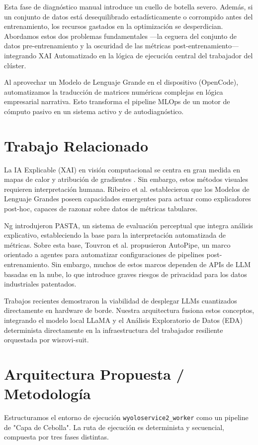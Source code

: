 \documentclass[10pt,twocolumn,letterpaper]{article}
\begin{document}
Esta fase de diagnóstico manual introduce un cuello de botella severo. Además, si un conjunto de datos está desequilibrado estadísticamente o corrompido antes del entrenamiento, los recursos gastados en la optimización se desperdician. Abordamos estos dos problemas fundamentales —la ceguera del conjunto de datos pre-entrenamiento y la oscuridad de las métricas post-entrenamiento— integrando XAI Automatizado en la lógica de ejecución central del trabajador del clúster.

Al aprovechar un Modelo de Lenguaje Grande en el dispositivo (OpenCode), automatizamos la traducción de matrices numéricas complejas en lógica empresarial narrativa. Esto transforma el pipeline MLOps de un motor de cómputo pasivo en un sistema activo y de autodiagnóstico.

\section{Trabajo Relacionado}
La IA Explicable (XAI) en visión computacional se centra en gran medida en mapas de calor y atribución de gradientes \cite{selvaraju2017grad, lundberg2017unified}. Sin embargo, estos métodos visuales requieren interpretación humana. Ribeiro et al. \cite{ribeiro2016should} establecieron que los Modelos de Lenguaje Grandes poseen capacidades emergentes para actuar como explicadores post-hoc, capaces de razonar sobre datos de métricas tabulares.

Ng \cite{ng2021data} introdujeron PASTA, un sistema de evaluación perceptual que integra análisis explicativo, estableciendo la base para la interpretación automatizada de métricas. Sobre esta base, Touvron et al. \cite{touvron2023llama} propusieron AutoPipe, un marco orientado a agentes para automatizar configuraciones de pipelines post-entrenamiento. Sin embargo, muchos de estos marcos dependen de APIs de LLM basadas en la nube, lo que introduce graves riesgos de privacidad para los datos industriales patentados.

Trabajos recientes demostraron la viabilidad de desplegar LLMs cuantizados directamente en hardware de borde. Nuestra arquitectura fusiona estos conceptos, integrando el modelo local LLaMA \cite{touvron2023llama} y el Análisis Exploratorio de Datos (EDA) determinista \cite{ng2021data} directamente en la infraestructura del trabajador resiliente orquestada por wisrovi-suit.

\section{Arquitectura Propuesta / Metodología}
Estructuramos el entorno de ejecución \texttt{wyoloservice2\_worker} como un pipeline de "Capa de Cebolla". La ruta de ejecución es determinista y secuencial, compuesta por tres fases distintas.
\end{document}
